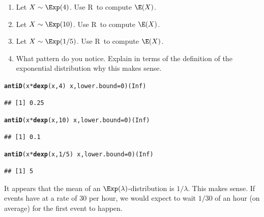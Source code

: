 \documentclass[twoside]{book}\usepackage[]{graphicx}\usepackage[]{xcolor}
\makeatletter
\newcommand{\hlnum}[1]{\textcolor[rgb]{0.686,0.059,0.569}{#1}}%
\newcommand{\hlopt}[1]{\textcolor[rgb]{0,0,0}{#1}}%
\newcommand{\hlstd}[1]{\textcolor[rgb]{0.345,0.345,0.345}{#1}}%
\newcommand{\hlkwc}[1]{\textcolor[rgb]{0.333,0.667,0.333}{#1}}%
\newcommand{\hlkwd}[1]{\textcolor[rgb]{0.737,0.353,0.396}{\textbf{#1}}}%
\newenvironment{kframe}{%
 \def\at@end@of@kframe{}%
 \ifinner\ifhmode%
  \def\at@end@of@kframe{\end{minipage}}%
  \begin{minipage}{\columnwidth}%
 \fi\fi%
 \def\FrameCommand##1{\hskip\@totalleftmargin \hskip-\fboxsep
 \colorbox{shadecolor}{##1}\hskip-\fboxsep
     \hskip-\linewidth \hskip-\@totalleftmargin \hskip\columnwidth}%
 \MakeFramed {\advance\hsize-\width
   \@totalleftmargin\z@ \linewidth\hsize
   \@setminipage}}%
 {\par\unskip\endMakeFramed%
 \at@end@of@kframe}
\newenvironment{knitrout}{}{} %
\def\R{{\sf R}}
\makeatother
\begin{document}
\begin{problem}
	\begin{enumerate}
		\item Let $X \sim \Exp(4)$.  Use \R\ to compute $\E(X)$.
		\item Let $X \sim \Exp(10)$.  Use \R\ to compute $\E(X)$.
		\item Let $X \sim \Exp(1/5)$.  Use \R\ to compute $\E(X)$.
		\item What pattern do you notice.  Explain in terms of 
			the definition of the exponential distribution why this
			makes sense.
	\end{enumerate}
\end{problem}

\begin{solution}
\begin{knitrout}
\color{fgcolor}\begin{kframe}
\begin{alltt}
\hlkwd{antiD}\hlstd{( x} \hlopt{*} \hlkwd{dexp}\hlstd{(x,} \hlnum{4}\hlstd{)} \hlopt{~} \hlstd{x,} \hlkwc{lower.bound}\hlstd{=}\hlnum{0}\hlstd{)(}\hlnum{Inf}\hlstd{)}
\end{alltt}
\begin{verbatim}
## [1] 0.25
\end{verbatim}
\begin{alltt}
\hlkwd{antiD}\hlstd{( x} \hlopt{*} \hlkwd{dexp}\hlstd{(x,} \hlnum{10}\hlstd{)} \hlopt{~} \hlstd{x,} \hlkwc{lower.bound}\hlstd{=}\hlnum{0}\hlstd{)(}\hlnum{Inf}\hlstd{)}
\end{alltt}
\begin{verbatim}
## [1] 0.1
\end{verbatim}
\begin{alltt}
\hlkwd{antiD}\hlstd{( x} \hlopt{*} \hlkwd{dexp}\hlstd{(x,} \hlnum{1}\hlopt{/}\hlnum{5}\hlstd{)} \hlopt{~} \hlstd{x,} \hlkwc{lower.bound}\hlstd{=}\hlnum{0}\hlstd{)(}\hlnum{Inf}\hlstd{)}
\end{alltt}
\begin{verbatim}
## [1] 5
\end{verbatim}
\end{kframe}
\end{knitrout}
	It appears that the mean of an $\Exp(\lambda)$-distribution is $1/\lambda$.  This
	makes sense.  If events have at a rate of $30$ per hour, we would expect to wait
	$1/30$ of an hour (on average) for the first event to happen.
\end{solution}
\end{document}
